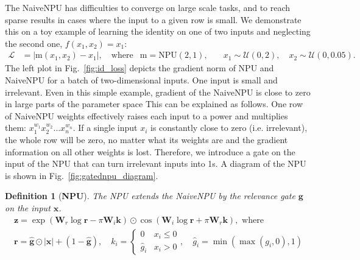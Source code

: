 \documentclass[9pt]{article}
\newtheorem*{definition}{Definition}
\newcommand{\Wre}{\bm W_{r}}
\newcommand{\Wim}{\bm W_{i}}
\newcommand{\npu}{\text{NPU}}
\begin{document}
The NaiveNPU has difficulties to converge on large scale tasks, and to reach
sparse results in cases where the input to a given row is small. We
demonstrate this on a toy example of learning the identity on one of two inputs and neglecting the second one, $f(x_1,x_2) = x_1$:
\begin{align}
  \nonumber
  \mathcal{L} &= |\text{m}(x_1,x_2) - x_1|, \quad \text{where}
  & \text{m} = \npu(2,1), \quad
  &x_1 \sim \mathcal U(0,2), \quad x_2 \sim \mathcal U(0,0.05).
\end{align}
The left plot in Fig.~\ref{fig:id_loss} depicts the gradient norm of NPU and
NaiveNPU for a batch of two-dimensional inputs. One input is small and
irrelevant. Even in this simple example, gradient of the NaiveNPU is close to
zero in large parts of the parameter space This can be explained as follows.
One row of NaiveNPU weights effectively raises each input to a power and
multiplies them: $x_1^{w_1} x_2^{w_2} \dots x_n^{w_n}$. If a single input $x_i$
is constantly close to zero (i.e. irrelevant), the whole row will be zero, no
matter what its weights are and the gradient information on all other weights
is lost.  Therefore, we introduce a gate on the input of the NPU that can turn
irrelevant inputs into 1s.
A diagram of the NPU is shown in Fig.~\ref{fig:gatednpu_diagram}.
\begin{definition}[{\bf NPU}]
  The NPU extends the NaiveNPU by the relevance gate $\bm g$ on the input $\bm x$.
   \begin{gather}
    \label{eq:gatednpu_def}
    \bm z = \exp(\Wre \log\bm r - \pi\Wim\bm k) 
          \odot \cos(\Wim\log \bm r + \pi\Wre\bm k), \text{ where } \\
    \bm r = \bm{\hat g} \odot |\bm x| + (1-\bm{\hat g}),
    \quad
    k_i = \begin{cases}
       0  & x_i \leq 0 \\
      \hat g_i & x_i > 0
    \end{cases},
    \quad
    \hat g_i = \min(\max(g_i,0),1)
  \end{gather}
\end{definition}
\end{document}
